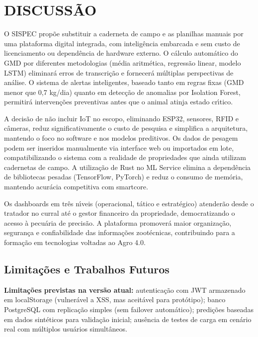 \documentclass[12pt,a4paper]{article}
\begin{document}
\section{DISCUSS\~AO}

O SISPEC prop\~oe substituir a caderneta de campo e as planilhas manuais por uma plataforma digital integrada, com intelig\^encia embarcada e sem custo de licenciamento ou depend\^encia de hardware externo. O c\'alculo autom\'atico do GMD por diferentes metodologias (m\'edia aritm\'etica, regress\~ao linear, modelo LSTM) eliminar\'a erros de transcri\c c\~ao e fornecer\'a m\'ultiplas perspectivas de an\'alise. O sistema de alertas inteligentes, baseado tanto em regras fixas (GMD menor que 0,7 kg/dia) quanto em detec\c c\~ao de anomalias por Isolation Forest, permitir\'a interven\c c\~oes preventivas antes que o animal atinja estado cr\'{\i}tico.

A decis\~ao de n\~ao incluir IoT no escopo, eliminando ESP32, sensores, RFID e c\^ameras, reduz significativamente o custo de pesquisa e simplifica a arquitetura, mantendo o foco no software e nos modelos preditivos. Os dados de pesagem podem ser inseridos manualmente via interface web ou importados em lote, compatibilizando o sistema com a realidade de propriedades que ainda utilizam cadernetas de campo. A utiliza\c c\~ao de Rust no ML Service elimina a depend\^encia de bibliotecas pesadas (TensorFlow, PyTorch) e reduz o consumo de mem\'oria, mantendo acur\'acia competitiva com smartcore.

Os dashboards em tr\^es n\'{\i}veis (operacional, t\'atico e estrat\'egico) atender\~ao desde o tratador no curral at\'e o gestor financeiro da propriedade, democratizando o acesso \`a pecu\'aria de precis\~ao. A plataforma promover\'a maior organiza\c c\~ao, seguran\c ca e confiabilidade das informa\c c\~oes zoot\'ecnicas, contribuindo para a forma\c c\~ao em tecnologias voltadas ao Agro 4.0.

\subsection{Limita\c c\~oes e Trabalhos Futuros}

\textbf{Limita\c c\~oes previstas na vers\~ao atual:} autentica\c c\~ao com JWT armazenado em localStorage (vulner\'avel a XSS, mas aceit\'avel para prot\'otipo); banco PostgreSQL com replica\c c\~ao simples (sem failover autom\'atico); predi\c c\~oes baseadas em dados sint\'eticos para valida\c c\~ao inicial; aus\^encia de testes de carga em cen\'ario real com m\'ultiplos usu\'arios simult\^aneos.
\end{document}
